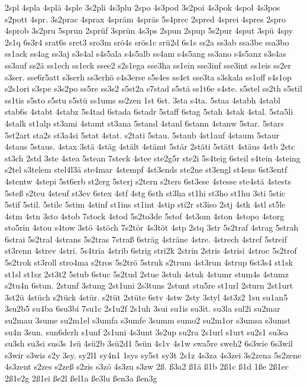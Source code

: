 {2spl
4spla
4splä
4sple
3s2pli
4s3plu
2spo
4s3pod
3s2poi
4s3pok
4spol
4s3pos
s2pott
4spr.
3s2prac
4sprax
4spräm
4spräs
5s4prec
2spred
4sprei
4spres
2spro
4sprob
3s2pru
5sprun
2sprüf
3sprün
4s3ps
2spun
2spup
5s2pur
4sput
3spü
4spy
2s1q
6s3r4
srat6s
sret3
sro3m
srö4s
srös1c
srü2d
6s1s
ss2a
ss3ab
ssa3be
ssa3bo
ss1ack
ss4ag
ss3aj
s3s4al
s4s5ala
s4s5alb
ss4am
s4s5ang
ss3ano
s4s5anz
s3s4as
ss3auf
ss2ä
ss1ech
ss1eck
ssee2
s2s1ega
sse3ha
ss1ein
sse3inf
sse3int
ss1eis
ss2er
s3ser.
sse6r5att
s3serh
ss3erhö
s4s3erse
s5s4es
ss4et
sse3ta
s3skala
ss1off
s4s1op
s2s1ori
s3spe
s3s2po
ss5re
ss3s2
s5st2a
s7stad
s5stä
ss1t6e
s4ste.
s5stel
ss2th
s5stil
ss1tis
s5sto
s5stu
s5stü
ss1ums
ss2zen
1st
6st.
3sta
s4ta.
5staa
4stabh
4stabl
stab6s
4stabt
4stabz
5s4tad
6stada
6stadr
5staff
6stag
5stah
4stak
4stal.
5sta5li
4stalk
st1alp
st3ami
4stamt
st3ana
5stand
4stanl
6stann
4stanw
5star.
5stars
5st2art
sta2s
st3a4si
5stat
4stat.
s2tati
5stau.
5staub
4st1auf
4staum
5staur
4staus
5staus.
4stax
3stä
4stäg
4stält
4stämt
5stär
2stäti
5stätt
4stäus
4stb
2stc
st3ch
2std
3ste
4stea
5stean
7steck
4stee
ste2g5r
ste2i
5s4teig
6steil
s4tein
4steing
s2tel
s3telem
stel4l3ä
ste4mar
4stempf
4st3ends
ste2ne
st3engl
st4ens
6st3entf
4stentw
4stepi
5st6erb
st2erg
5sterj
s2tern
s2ters
6st3ese
4stesse
ste4stä
4stests
5steß
s2teu
4steuf
st3ev
6stex
4stf
4stg
6sth
st3ha
st1hi
st3ho
st1hu
3sti
5stic
5stif
5stil.
5stile
5stim
4stinf
st1ins
st1int
4stip
sti2r
st3iso
2stj
4stk
4stl
st5le
4stm
4stn
3sto
4stob
7stock
4stod
5s2to3de
5stof
4st3om
4ston
4stopo
4storg
sto5rin
4stou
s4tow
3stö
4stöch
7s2tör
4s3töt
4stp
2stq
3str
5s2traf
4strag
5strah
6strai
5s2tral
4strans
5s2tras
7straß
6sträg
4sträne
4stre.
4strech
4stref
5streif
st3renn
4strev
4stri.
5s4tria
4strib
6strig
stri2k
2strin
2stris
4strisi
4stroc
5s2trof
5s2trok
st3roll
stro4ma
s2tros
5s2trö
5struk
s2trum
4st3run
4strup
6st3s4
st1sk
st1sl
st1sz
2st3t2
5stub
6stuc
5s2tud
2stue
3stuh
4stuk
4stumr
stum4s
4stumz
s2tu4n
6stun.
2stunf
3stung
2st1uni
2s3tuns
2stunt
stu5re
st1url
2sturn
2st1urt
3st2ü
4stüch
s2tück
4stür.
s2tüt
2stüte
6stv
4stw
2sty
3styl
4st3z2
1su
su1an5
3su2b5
su4ba
6su3bi
7su1c
2s1u2f
2s1uh
3sui
su1is
su3it.
su3la
sul2i
su2mar
su2mau
3sume
su2m1el
s3umfa
s3umfe
3summ
sumo2
su2m1or
s3umsa
s3umst
su4n
3sun.
sun6derh
s1unf
2s1uni
4s3unt
3s2up
su2ra
2s1url
s1urt
su2s1
su3sa
su3sh
su3si
sus3s
1sü
4sü2b
3sü2d1
5sün
4s1v
4s1w
swa5re
sweh2
6s3wie
6s3wil
s3wir
s3wis
s2y
3sy.
sy2l1
sy4n1
1sys
sy5st
sy3t
2s1z
4s3za
4s3zei
3s2zena
5s2zene
4s3zent
s2zes
s2zeß
s2zis
s3zö
4s3zu
s3zw
2ß.
ß3a2
ß1ä
ß1b
2ß1c
ß1d
1ße
2ß1ec
2ß1e2g
2ß1ei
ße2l
ßel1a
ße3lu
ßen3a
ßen3g
}
